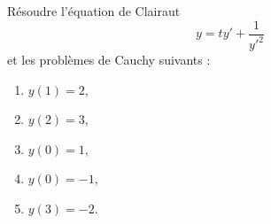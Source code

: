 \begin{exercice}\label{exo_II-1-28}

Résoudre l'équation de Clairaut
\begin{equation}
	y=ty'+\frac{1}{ y'^2 }
\end{equation}
et les problèmes de Cauchy suivants :
\begin{enumerate}
\item $y(1)=2$,
\item $y(2)=3$,
\item $y(0)=1$,
\item $y(0)=-1$,
\item $y(3)=-2$.
\end{enumerate}


\end{exercice}


